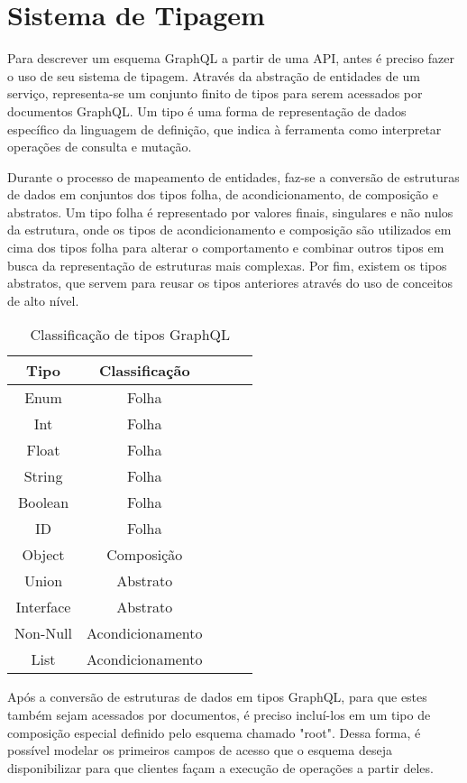 \section[Sistema de Tipagem]{Sistema de Tipagem}

Para descrever um esquema GraphQL a partir de uma API, antes é preciso fazer o uso de seu sistema de tipagem. Através da abstração de entidades de um serviço, representa-se um conjunto finito de tipos para serem acessados por documentos GraphQL. Um tipo é uma forma de representação de dados específico da linguagem de definição, que indica à ferramenta como interpretar operações de consulta e mutação.

Durante o processo de mapeamento de entidades, faz-se a conversão de estruturas de dados em conjuntos dos tipos folha, de acondicionamento, de composição e abstratos. Um tipo folha é representado por valores finais, singulares e não nulos da estrutura, onde os tipos de acondicionamento e composição são utilizados em cima dos tipos folha para alterar o comportamento e combinar outros tipos em busca da representação de estruturas mais complexas. Por fim, existem os tipos abstratos, que servem para reusar os tipos anteriores através do uso de conceitos de alto nível.

\begin{table}[H]
  \centering
  \begin{tabular}{|c|c|c|c|c|}
    \hline
    Tipo & Classificação \\
    \hline
    Enum & Folha \\
    \hline
    Int & Folha \\
    \hline
    Float & Folha \\
    \hline
    String & Folha \\
    \hline
    Boolean & Folha \\
    \hline
    ID & Folha \\
    \hline
    Object & Composição \\
    \hline
    Union & Abstrato \\
    \hline
    Interface & Abstrato \\
    \hline
    Non-Null & Acondicionamento \\
    \hline
  	List & Acondicionamento \\
    \hline
  \end{tabular}
  \caption{Classificação de tipos GraphQL}
\end{table}

Após a conversão de estruturas de dados em tipos GraphQL, para que estes também sejam acessados por documentos, é preciso incluí-los em um tipo de composição especial definido pelo esquema chamado "root". Dessa forma, é possível modelar os primeiros campos de acesso que o esquema deseja disponibilizar para que clientes façam a execução de operações a partir deles.

